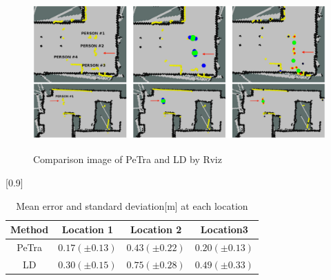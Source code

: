 \begin{figure}[h]
  \begin{center}
  \includegraphics[height=60mm,clip]{figure/2-4_result.png}
  \caption{Comparison image of PeTra and LD by Rviz
  \cite{Tracking People in a Mobile Robot From 2D LIDAR Scans Using Full Convolutional Neural Networks for Security in Cluttered Environments}}
  \label{2-4_result}
  \end{center}
\end{figure}

\begin{table}[h]
  \begin{center}
    \caption{{Mean error and standard deviation[m] at each location
    \cite{Tracking People in a Mobile Robot From 2D LIDAR Scans Using Full Convolutional Neural Networks for Security in Cluttered Environments}}
    \label{2-4_result_table}}
    \scalebox{1.0}[0.9]{
      \begin{tabular}{c|c|c|c} \hline
        Method & Location 1 & Location 2 & Location3 \\ \hline
        PeTra & $0.17 (\pm0.13)$ & $0.43 (\pm0.22)$ & $0.20 (\pm0.13)$ \\
        LD & $0.30 (\pm0.15)$ & $0.75 (\pm0.28)$ & $0.49 (\pm0.33)$ \\ \hline
      \end{tabular}
    }
  \end{center}
\end{table}

\clearpage

